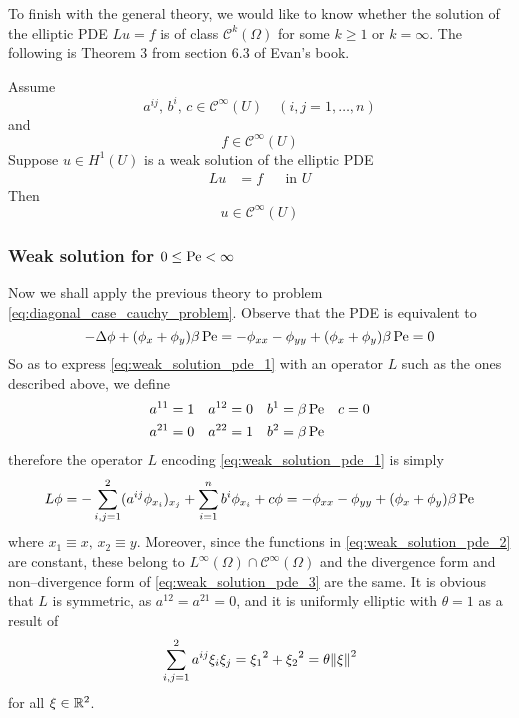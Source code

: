 To finish with the general theory, we would like to know whether the solution of
the elliptic PDE $L u = f$ is of class $\mathcal{C}^k(\Omega)$ for some $k \geq
1$ or $k = \infty$. The following is Theorem 3 from section 6.3 of Evan's book.

\begin{theorem} \label{teo:infinite_differentiability_interior}
	Assume
	\[
		a^{ij}, \, b^i, \, c \in \mathcal{C}^\infty(U) \quad 
		(i,j = 1, \ldots, n)	
	\]
	and
	\[
		f \in \mathcal{C}^\infty(U)
	\]
	Suppose $u \in H^1(U)$ is a weak solution of the elliptic PDE
	\[
		\begin{aligned}
			L u &= f & &\text{in } U
		\end{aligned}	
	\]
	Then
	\[
		u \in \mathcal{C}^\infty(U)
	\]
\end{theorem}

\subsubsection*{Weak solution for \texorpdfstring{$0 \leq \mathrm{Pe} <
\infty$}{finite Péclet's number}}

Now we shall apply the previous theory to problem
\eqref{eq:diagonal_case_cauchy_problem}. Observe that the PDE is equivalent to
\begin{equation} \label{eq:weak_solution_pde_1}
	-\Delta \phi + (\phi_x + \phi_y) \beta \, \mathrm{Pe} = 
	-\phi_{xx} - \phi_{yy} + (\phi_x + \phi_y) \beta \, \mathrm{Pe} = 0
\end{equation}
So as to express \eqref{eq:weak_solution_pde_1} with an operator $L$ such as the
ones described above, we define
\begin{equation} \label{eq:weak_solution_pde_2}
	\begin{aligned}
		a^{11} &= 1 	& 	a^{12} &= 0 	& 	b^1 &= \beta \, \mathrm{Pe}	& 	c &= 0 \\
		a^{21} &= 0 	& 	a^{22} &= 1 	& 	b^2 &= \beta \, \mathrm{Pe}
	\end{aligned}
\end{equation}
therefore the operator $L$ encoding \eqref{eq:weak_solution_pde_1} is simply
\begin{equation} \label{eq:weak_solution_pde_3}
	L \phi = 
	-\sum_{i,j=1}^2 (a^{ij} \phi_{x_i})_{x_j} + \sum_{i=1}^n b^i \phi_{x_i} + c \phi =
	-\phi_{xx} - \phi_{yy} + (\phi_x + \phi_y) \beta \, \mathrm{Pe} 
\end{equation}
where $x_1 \equiv x, \, x_2 \equiv y$. Moreover, since the functions in
\eqref{eq:weak_solution_pde_2} are constant, these belong to $L^\infty(\Omega) \cap \mathcal{C}^\infty(\Omega)$
and the divergence form and non--divergence form of
\eqref{eq:weak_solution_pde_3} are the same. It is obvious that $L$ is
symmetric, as $a^{12} = a^{21} = 0$, and it is uniformly elliptic with $\theta = 1$ as a result of
\begin{equation*}
	\sum_{i,j=1}^2 a^{ij} \xi_i \xi_j = 
	{\xi_1}^2 + {\xi_2}^2 = \theta \norm{\xi}^2
\end{equation*}
for all $\xi \in \mathbb{R}^2$.

